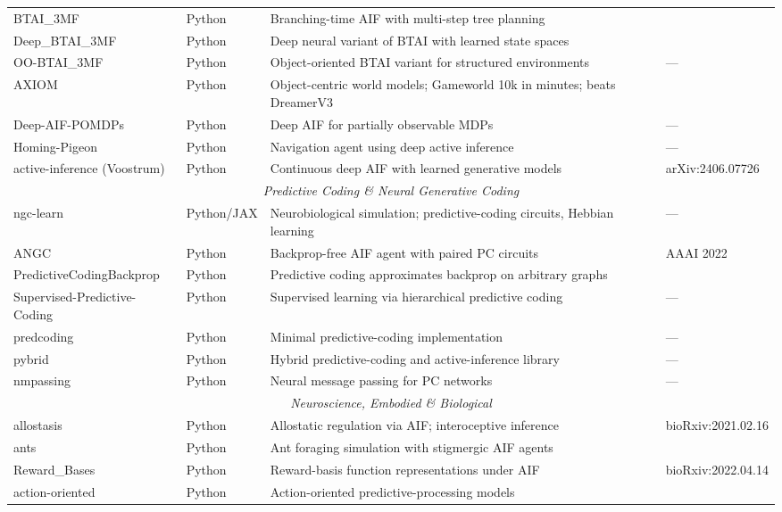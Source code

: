 \documentclass[
  english,
]{article}
\begin{document}
{{{{{{{{{{{{{{{{\begin{center}
\begin{longtable}{p{3.2cm} p{1.6cm} p{6.4cm} p{2.5cm}}
BTAI\_3MF & Python & Branching-time AIF with multi-step tree planning & \cite{champion2021realizing} \\
Deep\_BTAI\_3MF & Python & Deep neural variant of BTAI with learned state spaces & \cite{champion2021realizing} \\
OO-BTAI\_3MF & Python & Object-oriented BTAI variant for structured environments & --- \\
AXIOM & Python & Object-centric world models; Gameworld 10k in minutes; beats DreamerV3 & \cite{heins2025axiom} \\
Deep-AIF-POMDPs & Python & Deep AIF for partially observable MDPs & --- \\
Homing-Pigeon & Python & Navigation agent using deep active inference & --- \\
active-inference (Voostrum) & Python & Continuous deep AIF with learned generative models & arXiv:2406.07726 \\
\midrule
\multicolumn{4}{c}{\textit{Predictive Coding \& Neural Generative Coding}} \\
\midrule
ngc-learn & Python/JAX & Neurobiological simulation; predictive-coding circuits, Hebbian learning & --- \\
ANGC & Python & Backprop-free AIF agent with paired PC circuits & AAAI 2022 \\
PredictiveCodingBackprop & Python & Predictive coding approximates backprop on arbitrary graphs & \cite{millidge2022predictive} \\
Supervised-Predictive-Coding & Python & Supervised learning via hierarchical predictive coding & --- \\
predcoding & Python & Minimal predictive-coding implementation & --- \\
pybrid & Python & Hybrid predictive-coding and active-inference library & --- \\
nmpassing & Python & Neural message passing for PC networks & --- \\
\midrule
\multicolumn{4}{c}{\textit{Neuroscience, Embodied \& Biological}} \\
\midrule
allostasis & Python & Allostatic regulation via AIF; interoceptive inference & bioRxiv:2021.02.16 \\
ants & Python & Ant foraging simulation with stigmergic AIF agents & \cite{heins2024collective} \\
Reward\_Bases & Python & Reward-basis function representations under AIF & bioRxiv:2022.04.14 \\
action-oriented & Python & Action-oriented predictive-processing models & \cite{tschantz2020action} \\

\end{longtable}
\end{center}}}}}}}}}}}}}}}}}
\end{document}

